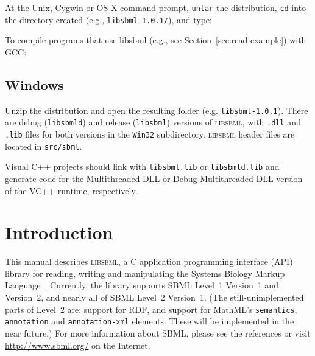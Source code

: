 \documentclass{cekmanual}
\begin{document}
At the Unix, Cygwin or OS X command prompt, \texttt{untar} the
distribution, \texttt{cd} into the directory created (e.g.,
\texttt{libsbml-1.0.1/}), and type:

\begin{example}[csh]
\end{example}

To compile programs that use libsbml (e.g., see
Section~\ref{sec:read-example}) with GCC:

\begin{example}[csh]
\end{example}


\subsection{Windows}

Unzip the distribution and open the resulting folder
(e.g. \texttt{libsbml-1.0.1}).  There are debug (\texttt{libsbmld})
and release (\texttt{libsbml}) versions of \textsc{libsbml}, with
\texttt{.dll} and \texttt{.lib} files for both versions in the
\texttt{Win32} subdirectory.  \textsc{libsbml} header files are
located in \texttt{src/sbml}.

Visual C++ projects should link with \texttt{libsbml.lib} or
\texttt{libsbmld.lib} and generate code for the Multithreaded DLL or
Debug Multithreaded DLL version of the VC++ runtime, respectively.


\section{Introduction}
\label{sec:introduction}

This manual describes \textsc{libsbml}, a C application programming
interface (API) library for reading, writing and manipulating the Systems
Biology Markup
Language~\citep[SBML;][]{hucka:2001,hucka:2003,finney:2003c}.  Currently,
the library supports SBML Level~1 Version~1 and Version~2, and nearly all
of SBML Level~2 Version~1.  (The still-unimplemented parts of Level~2 are:
support for RDF, and support for MathML's \texttt{semantics},
\texttt{annotation} and \texttt{annotation-xml} elements.  These will be
implemented in the near future.)  For more information about SBML, please
see the references or visit \url{http://www.sbml.org/} on the Internet.
\end{document}
